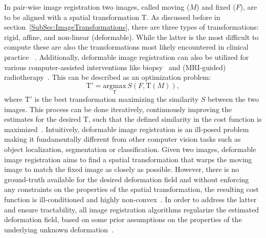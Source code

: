 In pair-wise image registration two images, called moving ($M$) and fixed ($F$), are to be aligned with a spatial transformation T. As discussed before in section~\ref{SubSec:ImageTransformations}, there are three types of transformations: rigid, affine, and non-linear (deformable). While the latter is the most difficult to compute these are also the transformations most likely encountered in clinical practice
~\cite{Zou2022}. Additionally, deformable image registration can also be
utilized for various computer-assisted interventions like biopsy~\cite{Tam2016} and (MRI-guided) radiotherapy~\cite{Chen2017, Rigaud2019}. This can be described as an optimization problem:
\begin{equation}
	\text{T}' = \underset{\text{T}}{\text{argmax}} \, S(F, \text{T}(M)),
\end{equation}
where $\text{T}'$ is the best transformation maximizing the similarity $S$ between the two images. This process can be done iteratively, continuously improving the estimates for the desired T, such that the defined similarity in the cost function is maximized~\cite{Chen2020}. Intuitively, deformable image registration is an ill-posed problem making it fundamentally different from other computer vision tasks such as object localization, segmentation or classification. Given two images, deformable image registration aims to find a spatial transformation that warps the moving image to match the fixed image as closely as possible. However, there is no ground-truth available for the desired deformation field and without enforcing any constraints on the properties of the spatial transformation, the resulting cost function is ill-conditioned and highly non-convex~\cite{Chen2020}. In order to address the latter and ensure tractability, all image registration algorithms regularize the estimated deformation field, based on some prior assumptions on the properties of the underlying unknown deformation~\cite{Chen2020}.\\
